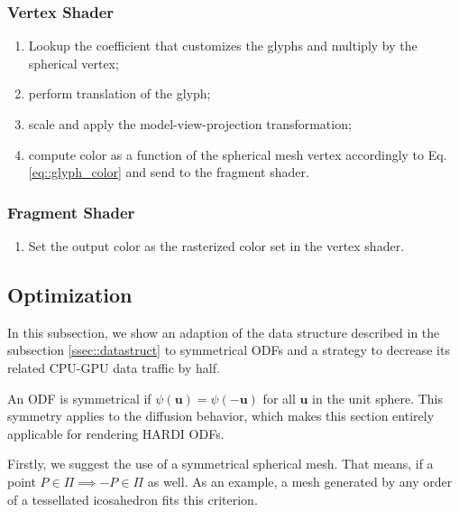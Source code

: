 \documentclass[twoside,twocolumn,10pt]{article}
\begin{document}
\subsubsection{Vertex Shader}
\begin{enumerate}
    \item Lookup the coefficient that customizes the glyphs and multiply by the spherical vertex;
    \item perform translation of the glyph;
    \item scale and apply the model-view-projection transformation;
    \item compute color as a function of the spherical mesh vertex accordingly to Eq. \ref{eq::glyph_color} and send to the fragment shader.
\end{enumerate}
\subsubsection{Fragment Shader}
\begin{enumerate}
    \item Set the output color as the rasterized color set in the vertex shader.
\end{enumerate}



\subsection{Optimization}
\label{ssec::optimization}

In this subsection, we show an adaption of the data structure described in the subsection \ref{ssec::datastruct} to symmetrical ODFs and a strategy to decrease its related CPU-GPU data traffic by half.

An ODF is symmetrical if $\psi(\bm{u}) = \psi(-\bm{u})$ for all $\bm{u}$ in the unit sphere. This symmetry applies to the diffusion behavior, which makes this section entirely applicable for rendering HARDI ODFs.%

Firstly, we suggest the use of a symmetrical spherical mesh. That means, if a point $P \in \Pi \implies -P \in \Pi$ as well. As an example, a mesh generated by any order of a tessellated icosahedron fits this criterion.
\end{document}
